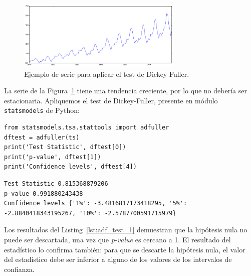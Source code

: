 \documentclass[11pt,spanish,listoffigures,listoftables]{tfgetsinf}
\begin{document}
    
    \begin{figure}[h]
        \centering
        \includegraphics[width=0.7\textwidth]{time_serie_1.png}
        \caption{Ejemplo de serie para aplicar el test de Dickey-Fuller.}
        \label{fig:time_serie_1}
    \end{figure}
    
    La serie de la Figura~\ref{fig:time_serie_1} tiene una tendencia creciente, por lo que no debería ser estacionaria. Apliquemos el test de Dickey-Fuller, presente en módulo {\tt statsmodels} de Python:
    
    \lstset{style=python}
    \begin{lstlisting}[caption=Test de Dickey-Fuller de {\tt statsmodels} de Python., label={lst:adf_test_1}]
from statsmodels.tsa.stattools import adfuller
dftest = adfuller(ts)
print('Test Statistic', dftest[0])
print('p-value', dftest[1])
print('Confidence levels', dftest[4])  
    \end{lstlisting}
    
    \lstset{style=python}
    \begin{lstlisting}[caption=Resultados del test de Dickey-Fuller de {\tt statsmodels} de Python., label={lst:adf_res_1}]
Test Statistic 0.815368879206
p-value 0.991880243438
Confidence levels {'1%': -3.4816817173418295, '5%': -2.8840418343195267, '10%': -2.5787700591715979}
    \end{lstlisting}
    
    Los resultados del Listing~\ref{lst:adf_test_1} demuestran que la hipótesis nula no puede ser descartada, una vez que {\em p-value} es cercano a 1. El resultado del estadístico lo confirma también: para que se descarte la hipótesis nula, el valor del estadístico debe ser inferior a alguno de los valores de los intervalos de confianza.
    
\end{document}
